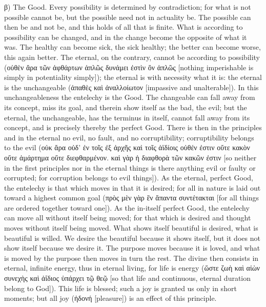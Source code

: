 \documentclass[12pt]{book}
\begin{document}
β) The Good. Every possibility is determined by contradiction; for what is not possible cannot be,
but the possible need not in actuality be. The possible can then be and not be, and this holds of
all that is finite. What is according to possibility can be changed, and in the change become the
opposite of what it was. The healthy can become sick, the sick healthy; the better can become
worse, this again better. The eternal, on the contrary, cannot be according to possibility (οὐθὲν
ἄρα τῶν ἀφθάρτων ἁπλῶς δυνάμει ἐστὶν ὂν ἁπλῶς [nothing imperishable is simply in potentiality
simply]); the eternal is with necessity what it is: the eternal is the unchangeable (ἀπαθὲς καὶ
ἀναλλοίωτον [impassive and unalterable]). In this unchangeableness the entelechy is the Good. The
changeable can fall away from its concept, miss its goal, and therein show itself as the bad, the
evil; but the eternal, the unchangeable, has the terminus in itself, cannot fall away from its
concept, and is precisely thereby the perfect Good. There is then in the principles and in the
eternal no evil, no fault, and no corruptibility; corruptibility belongs to the evil (οὐκ ἄρα οὐδ'
ἐν τοῖς ἐξ ἀρχῆς καὶ τοῖς ἀϊδίοις οὐθέν ἐστιν οὔτε κακὸν οὔτε ἁμάρτημα
οὔτε διεφθαρμένον. καὶ γὰρ ἡ διαφθορὰ τῶν κακῶν ἐστιν [so neither in the first principles nor in the
eternal things is there anything evil or faulty or corrupted; for corruption belongs to evil
things]). As the eternal, perfect Good, the entelechy is that which moves in that it is desired; for
all in nature is laid out toward a highest common goal (πρὸς μὲν γὰρ ἓν ἅπαντα συντέτακται [for all
things are ordered together toward one]). As the in-itself perfect Good, the entelechy can move all
without itself being moved; for that which is desired and thought moves without itself being moved.
What shows itself beautiful is desired, what is beautiful is willed. We desire the beautiful because
it shows itself, but it does not show itself because we desire it. The purpose moves because it is
loved, and what is moved by the purpose then moves in turn the rest. The divine then consists in
eternal, infinite energy, thus in eternal living, for life is energy (ὥστε ζωὴ καὶ αἰὼν συνεχὴς καὶ
ἀΐδιος ὑπάρχει τῷ θεῷ [so that life and continuous, eternal duration belong to God]). This life is
blessed; such a joy is granted us only in short moments; but all joy (ἡδονή [pleasure]) is an effect
of this principle.
\end{document}
